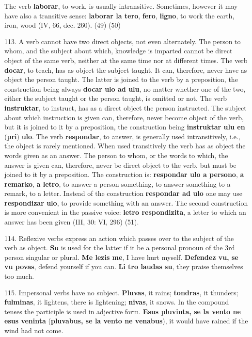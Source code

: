 The verb \textbf{laborar}, to work, is usually intransitive. Sometimes, however it may have also a transitive sense: \textbf{laborar la tero}, \textbf{fero}, \textbf{ligno}, to work the earth, iron, wood (IV, 66, dec. 260). (49) (50)

113. A verb cannot have two direct objects, not even alternately. The person to whom, and the subject about which, knowledge is imparted cannot be direct object of the same verb, neither at the same time nor at different times. The verb \textbf{docar}, to teach, has as object the subject taught. It can, therefore, never have as object the person taught. The latter is joined to the verb by a preposition, the construction being always \textbf{docar ulo ad ulu}, no matter whether one of the two, either the subject taught or the person taught, is omitted or not. The verb \textbf{instruktar}, to instruct, has as a direct object the person instructed. The subject about which instruction is given can, therefore, never become object of the verb, but it is joined to it by a preposition, the construction being \textbf{instruktar ulu en }(\textbf{pri})\textbf{ ulo}. The verb \textbf{respondar}, to answer, is generally used intransitively, i.e., the object is rarely mentioned. When used transitively the verb has as object the words given as an answer. The person to whom, or the words to which, the answer is given can, therefore, never be direct object to the verb, but must be joined to it by a preposition. The construction is: \textbf{respondar ulo a persono}, \textbf{a remarko}, \textbf{a letro}, to answer a person something, to answer something to a remark, to a letter. Instead of the construction \textbf{respondar ad ulo} one may use \textbf{respondizar ulo}, to provide something with an answer. The second construction is more convenient in the passive voice: \textbf{letro respondizita}, a letter to which an answer has been given (III, 30: VI, 296) (51).

114. Reflexive verbs express an action which passes over to the subject of the verb as object. \textbf{Su} is used for the latter if it be a personal pronoun of the 3rd person singular or plural. \textbf{Me lezis me}, I have hurt myself. \textbf{Defendez vu, se vu povas}, defend yourself if you can. \textbf{Li tro laudas su}, they praise themselves too much.

115. Impersonal verbs have no subject. \textbf{Pluvas}, it rains; \textbf{tondras}, it thunders; \textbf{fulminas}, it lightens, there is lightening; \textbf{nivas}, it snows. In the compound tenses the participle is used in adjective form. \textbf{Esus pluvinta, se la vento ne esus veninta} (\textbf{pluvabus, se la vento ne venabus}), it would have rained if the wind had not come.

